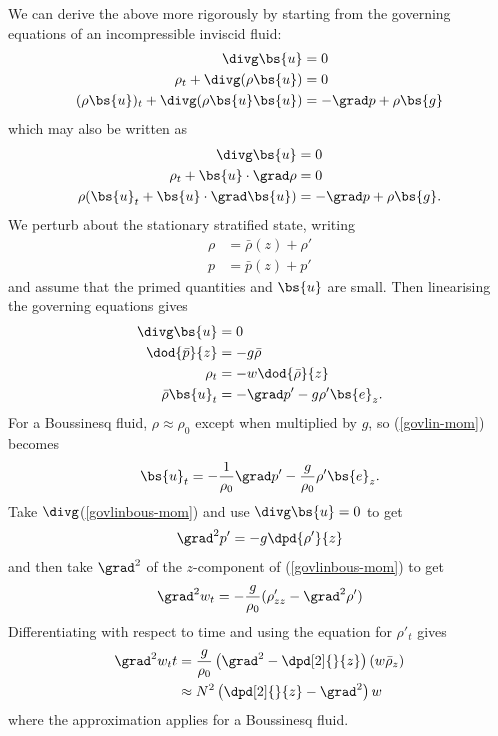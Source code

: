 We can derive the above more rigorously by starting from the governing equations of an incompressible inviscid fluid:
\begin{align}
	\divg\bs{u} &= 0\\
	\rho_t + \divg(\rho\bs{u}) &= 0\\
	(\rho\bs{u})_t +\divg(\rho\bs{u}\bs{u}) &= -\grad p + \rho\bs{g} 
\end{align}
which may also be written as 
\begin{align}
	\divg\bs{u} &= 0\\
	\rho_t + \bs{u}\cdot\grad\rho &= 0\\
	\rho (\bs{u}_t +\bs{u}\cdot\grad\bs{u}) &= -\grad p + \rho\bs{g}.
\end{align}
We perturb about the stationary stratified state, writing
\begin{align}
	\rho &= \bar{\rho}(z) + \rho' \\
	p &= \bar{p}(z) + p' 
\end{align}
and assume that the primed quantities and $\bs{u}$ are small. Then linearising the governing equations gives
\begin{align}
	\divg\bs{u} &= 0\\
	\dod{\bar{p}}{z} &= -g\bar{\rho} \\
	\rho_t &= -w\dod{\bar{\rho}}{z} \\
	\bar{\rho} \bs{u}_t &= -\grad p' - g\rho'\bs{e}_z. \label{govlin-mom}
\end{align}
For a Boussinesq fluid, $\rho\approx\rho_0$ except when multiplied by $g$, so (\ref{govlin-mom}) becomes
\begin{align}
	\bs{u}_t = -\frac{1}{\rho_0}\grad p' - \frac{g}{\rho_0} \rho' \bs{e}_z. \label{govlinbous-mom}
\end{align}
Take $\divg$(\ref{govlinbous-mom}) and use $\divg\bs{u} = 0$ to get
\begin{equation}
	\grad^2p' = -g\dpd{\rho'}{z}
\end{equation}
and then take $\grad^2$ of the $z$-component of (\ref{govlinbous-mom}) to get 
\begin{equation}
	\grad^2 w_t = -\frac{g}{\rho_0} (\rho'_{zz} - \grad^2 \rho')
\end{equation}
Differentiating with respect to time and using the equation for $\rho'_t$ gives
\begin{align}
	\grad^2w_tt &= \frac{g}{\rho_0} \left(\grad^2 - \dpd[2]{}{z}\right) (w\bar{\rho}_z) \\
			&\approx N^2 \left(\dpd[2]{}{z} - \grad^2\right) w
			\label{igw-govlin-w}
\end{align}
where the approximation applies for a Boussinesq fluid.

